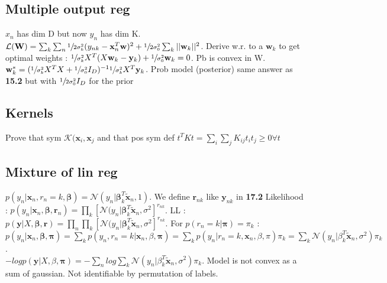 \subsection{Multiple output reg}
$x_n$ has dim D but now $y_n$ has dim K. 
$\mathcal{L}(\mathbf{W}) = \sum_k \sum_n \sfrac{1}{2 \sigma^2_k}(y_{nk} -\mathbf{x}^T_n \mathbf{w})^2 + \sfrac{1}{2 \sigma_0^2}\sum_k ||\mathbf{w}_k||^2$. Derive w.r. to a $\mathbf{w}_k$ to get optimal weights : $\sfrac{1}{ \sigma^2_k} X^T(X \mathbf{w}_k - \mathbf{y}_k) + \sfrac{1}{\sigma_0^2} \mathbf{w}_k = 0$. Pb is convex in W. $\mathbf{w}^*_k = (\sfrac{1}{ \sigma^2_k} X^T X + \sfrac{1}{\sigma_0^2} I_D)^{-1} \sfrac{1}{\sigma^2_k} X^T \mathbf{y}_k$. 
Prob model (posterior) same answer as \textbf{15.2} but with $\sfrac{1}{2 \sigma_0^2} I_D$ for the prior

\subsection{Kernels}
Prove that sym $\mathcal{K}(\mathbf{x}_i, \mathbf{x}_j$ and that pos sym def $t^T K t = \sum_i \sum_j K_{ij} t_i t_j \geq 0 \forall t$

\subsection{Mixture of lin reg}
$p(y_n|\mathbf{x}_n, r_n = k, \mathbf{\beta}) = \mathcal{N}(y_n|\mathbf{\beta}_k^T \mathbf{\tilde{x}}_n, 1)$. We define $\mathbf{r}_{nk}$ like $\mathbf{y}_{nk}$ in \textbf{17.2}
Likelihood : $p(y_n|\mathbf{x}_n, \mathbf{\beta}, \mathbf{r}_n) = \prod_k [\mathcal{N}(y_n|\mathbf{\beta}_k^T \mathbf{\tilde{x}}_n , \sigma^2]^{r_{nk}}$. LL : $p(\mathbf{y}|X, \mathbf{\beta}, \mathbf{r}) = \prod_n \prod_k [\mathcal{N}(y_n|\mathbf{\beta}_k^T \mathbf{\tilde{x}}_n , \sigma^2]^{r_{nk}}$. 
For $p(r_n = k | \mathbf{\pi}) = \pi_k$ : $p(y_n|\mathbf{x}_n, \mathbf{\beta}, \mathbf{\pi}) = \sum_k p(y_n, r_n = k| \mathbf{x}_n, \beta, \mathbf{\pi}) = \sum_k p(y_n | r_n = k, \mathbf{x}_n, \beta, \pi)\pi_k = \sum_k \mathcal{N}(y_n|\beta^T_k \mathbf{\tilde{x}}_n, \sigma^2) \pi_k$.\\
$- log p(\mathbf{y} | X, \beta, \mathbf{\pi}) = -\sum_n log \sum_k \mathcal{N}(y_n|\beta^T_k \mathbf{\tilde{x}}_n, \sigma^2) \pi_k$.
Model is not convex as a sum of gaussian. Not identifiable by permutation of labels.



